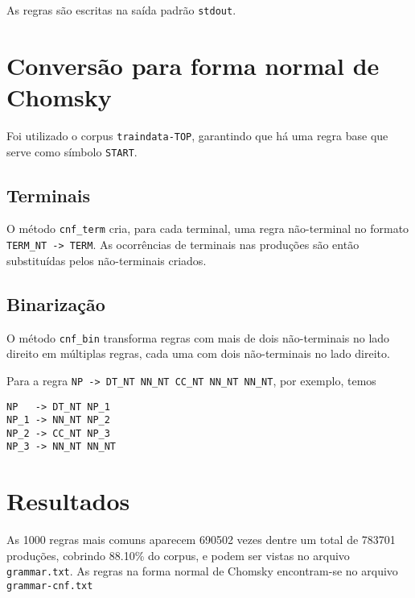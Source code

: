 \documentclass[12pt, a4paper]{article}
\newcommand{\code}[1]{{\lstinline{#1}}}
\begin{document}
As regras são escritas na saída padrão \code{stdout}.

\section{Conversão para forma normal de Chomsky}
Foi utilizado o corpus \code{traindata-TOP}, garantindo que há
uma regra base que serve como símbolo \code{START}. 

\subsection{Terminais}
O método \code{cnf_term} cria, para cada terminal, uma regra não-terminal no formato
\code{TERM_NT -> TERM}. As ocorrências de terminais nas produções são então
substituídas pelos não-terminais criados.

\subsection{Binarização}
O método \code{cnf_bin} transforma regras com mais de dois não-terminais no lado direito
em múltiplas regras, cada uma com dois não-terminais no lado direito.

Para a regra \code{NP -> DT_NT NN_NT CC_NT NN_NT NN_NT}, por exemplo, temos

\begin{lstlisting}[columns=fixed]
NP   -> DT_NT NP_1
NP_1 -> NN_NT NP_2
NP_2 -> CC_NT NP_3
NP_3 -> NN_NT NN_NT
\end{lstlisting}


\section{Resultados}
As 1000 regras mais comuns aparecem 690502 vezes dentre um total de 783701
produ\-ções, cobrindo 88.10\% do corpus, e podem ser vistas no arquivo
\code{grammar.txt}. As regras na forma normal de Chomsky encontram-se no arquivo
\code{grammar-cnf.txt}
\end{document}
